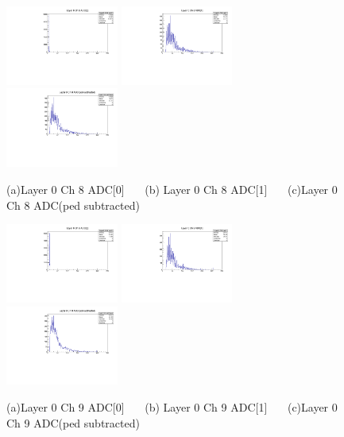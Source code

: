 \documentclass[a4paper,11pt]{article}
\theoremstyle{mytheor}
\begin{document}
\begin{figure}[H] 
\vspace*{-0.3cm} 
\includegraphics[width=0.33\textwidth,scale=0.5,trim=0 0 0 0,clip]{plotsdir/file0_muons-Layer0_Ch8_adc0-1.pdf} 
\includegraphics[width=0.33\textwidth,scale=0.5,trim=0 0 0 0,clip]{plotsdir/file0_muons-Layer0_Ch8_adc1-1.pdf} 
\includegraphics[width=0.33\textwidth,scale=0.5,trim=0 0 0 0,clip]{plotsdir/file0_muons-Layer0_Ch8_adcPedsub-1.pdf} 
\caption{(a)Layer 0 Ch 8 ADC[0] ~~~(b) Layer 0 Ch 8 ADC[1] ~~~(c)Layer 0 Ch 8 ADC(ped subtracted) } 
\end{figure} 
\begin{figure}[H] 
\vspace*{-0.3cm} 
\includegraphics[width=0.33\textwidth,scale=0.5,trim=0 0 0 0,clip]{plotsdir/file0_muons-Layer0_Ch9_adc0-1.pdf} 
\includegraphics[width=0.33\textwidth,scale=0.5,trim=0 0 0 0,clip]{plotsdir/file0_muons-Layer0_Ch9_adc1-1.pdf} 
\includegraphics[width=0.33\textwidth,scale=0.5,trim=0 0 0 0,clip]{plotsdir/file0_muons-Layer0_Ch9_adcPedsub-1.pdf} 
\caption{(a)Layer 0 Ch 9 ADC[0] ~~~(b) Layer 0 Ch 9 ADC[1] ~~~(c)Layer 0 Ch 9 ADC(ped subtracted) } 
\end{figure} 
\end{document}
